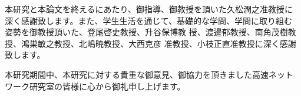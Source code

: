 \documentclass[main]{subfiles}
\begin{document}
\acknowledgment

本研究と本論文を終えるにあたり、御指導、御教授を頂いた久松潤之准教授に
深く感謝致します。また、学生生活を通じて、基礎的な学問、学問に取り組む
姿勢を御教授頂いた、登尾啓史教授、升谷保博教
授、渡邊郁教授、南角茂樹教授、鴻巣敏之教授、北嶋暁教授、大西克彦
准教授、小枝正直准教授に深く感謝致します。

本研究期間中、本研究に対する貴重な御意見、御協力を頂きました高速ネット
ワーク研究室の皆様に心から御礼申し上げます。
\end{document}
